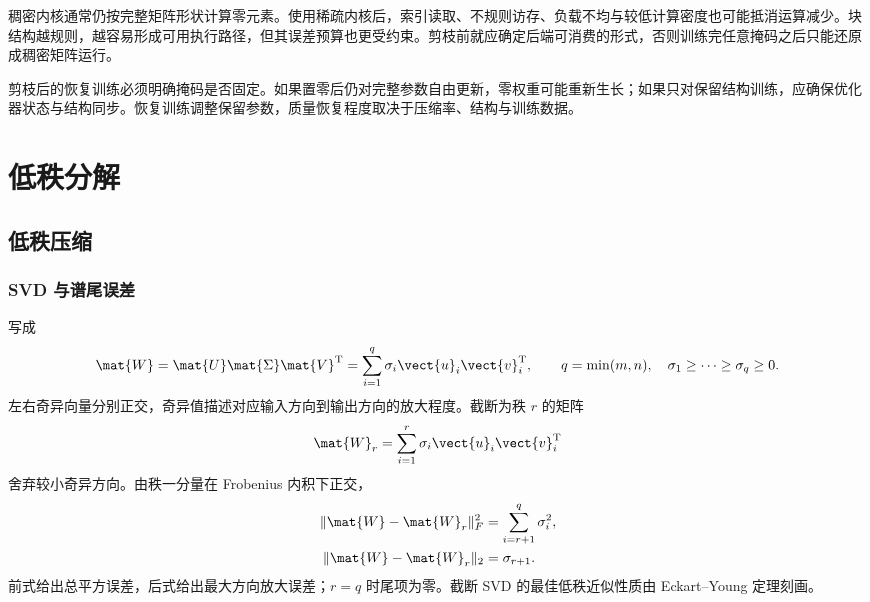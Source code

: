 \documentclass[../textbook.tex]{subfiles}
\begin{document}
稠密内核通常仍按完整矩阵形状计算零元素。使用稀疏内核后，索引读取、不规则访存、负载不均与较低计算密度也可能抵消运算减少。块结构越规则，越容易形成可用执行路径，但其误差预算也更受约束。剪枝前就应确定后端可消费的形式，否则训练完任意掩码之后只能还原成稠密矩阵运行。

剪枝后的恢复训练必须明确掩码是否固定。如果置零后仍对完整参数自由更新，零权重可能重新生长；如果只对保留结构训练，应确保优化器状态与结构同步。恢复训练调整保留参数，质量恢复程度取决于压缩率、结构与训练数据。

\section{低秩分解}
\subsection{低秩压缩}

\subsubsection{SVD 与谱尾误差}
写成
\begin{equation}
 \mat{W}=\mat{U}\mat{\Sigma} \mat{V}^{\mathrm{T}}=\sum_{i=1}^{q}\sigma_i \vect{u}_i\vect{v}_i^{\mathrm{T}},
 \qquad q=\min(m,n),\quad\sigma_1\geq\cdots\geq\sigma_q\geq0.
\end{equation}
左右奇异向量分别正交，奇异值描述对应输入方向到输出方向的放大程度。截断为秩 $r$ 的矩阵
\begin{equation}
 \mat{W}_r=\sum_{i=1}^{r}\sigma_i \vect{u}_i\vect{v}_i^{\mathrm{T}}
\end{equation}
舍弃较小奇异方向。由秩一分量在 Frobenius 内积下正交，
\begin{equation}\label{eq:compress-svdtail}
\begin{aligned}
 \|\mat{W}-\mat{W}_r\|_F^2 &= \sum_{i=r+1}^{q}\sigma_i^2, \\
 \|\mat{W}-\mat{W}_r\|_2 &= \sigma_{r+1}.
\end{aligned}
\end{equation}
前式给出总平方误差，后式给出最大方向放大误差；$r=q$ 时尾项为零。截断 SVD 的最佳低秩近似性质由 Eckart--Young 定理刻画。\cite{eckart1936approximation}
\end{document}
